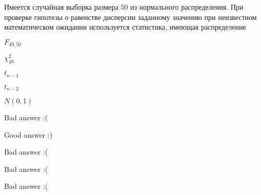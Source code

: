 
\begin{question}
Имеется случайная выборка размера \(50\) из нормального распределения.
При проверке гипотезы о равенстве дисперсии заданному значению при
неизвестном математическом ожидании используется статистика, имеющая
распределение
\begin{answerlist}
  \item \(F_{49,50}\)
  \item \(\chi^2_{49}\)
  \item \(t_{n-1}\)
  \item \(t_{n-2}\)
  \item \(N(0,1)\)
\end{answerlist}
\end{question}

\begin{solution}
\begin{answerlist}
  \item Bad answer :(
  \item Good answer :)
  \item Bad answer :(
  \item Bad answer :(
  \item Bad answer :(
\end{answerlist}
\end{solution}

